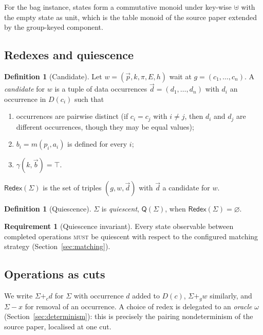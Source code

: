 \documentclass[11pt]{article}
\theoremstyle{plain}
\theoremstyle{definition}
\newtheorem{definition}[proposition]{Definition}
\newtheorem{requirement}{Requirement}
\newcommand{\Red}{\mathsf{Redex}}
\newcommand{\Qui}{\mathsf{Q}}
\newcommand{\MUST}{\textsc{must}}
\begin{document}
For the bag instance, states form a commutative monoid under key-wise $\uplus$
with the empty state as unit, which is the table monoid of the source paper
extended by the group-keyed component.

\subsection{Redexes and quiescence}

\begin{definition}[Candidate]\label{def:candidate}
Let $w=(\vec p,k,\pi,E,h)$ wait at $g=(c_1,\dots,c_n)$. A \emph{candidate} for $w$
is a tuple of data occurrences $\vec d=(d_1,\dots,d_n)$ with $d_i$ an occurrence in
$D(c_i)$ such that
\begin{enumerate}[nosep]
\item occurrences are pairwise distinct (if $c_i=c_j$ with $i\neq j$, then
      $d_i$ and $d_j$ are different occurrences, though they may be equal
      values);
\item $b_i=m(p_i,a_i)$ is defined for every $i$;
\item $\gamma(k,\vec b)=\top$.
\end{enumerate}
$\Red(\Sigma)$ is the set of triples $(g,w,\vec d)$ with $\vec d$ a candidate for
$w$.
\end{definition}

\begin{definition}[Quiescence]
$\Sigma$ is \emph{quiescent}, $\Qui(\Sigma)$, when $\Red(\Sigma)=\varnothing$.
\end{definition}

\begin{requirement}[Quiescence invariant]\label{req:qui}
Every state observable between completed operations \MUST{} be quiescent with
respect to the configured matching strategy (Section~\ref{sec:matching}).
\end{requirement}

\subsection{Operations as cuts}\label{sec:opsem}

We write $\Sigma+_c d$ for $\Sigma$ with occurrence $d$ added to $D(c)$,
$\Sigma+_g w$ similarly, and $\Sigma-x$ for removal of an occurrence. A choice of
redex is delegated to an \emph{oracle} $\omega$ (Section~\ref{sec:determinism}):
this is precisely the pairing nondeterminism of the source paper, localised at
one cut.
\end{document}
